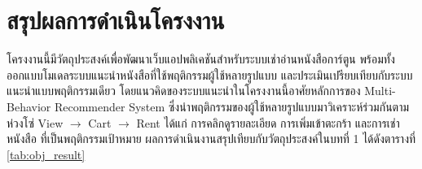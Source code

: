 
\section{สรุปผลการดำเนินโครงงาน}

โครงงานนี้มีวัตถุประสงค์เพื่อพัฒนาเว็บแอปพลิเคชันสำหรับระบบเช่าอ่านหนังสือการ์ตูน
พร้อมทั้งออกแบบโมเดลระบบแนะนำหนังสือที่ใช้พฤติกรรมผู้ใช้หลายรูปแบบ และประเมินเปรียบเทียบกับระบบแนะนำแบบพฤติกรรมเดียว
โดยแนวคิดของระบบแนะนำในโครงงานนี้อาศัยหลักการของ Multi-Behavior Recommender System
ซึ่งนำพฤติกรรมของผู้ใช้หลายรูปแบบมาวิเคราะห์ร่วมกันตามห่วงโซ่ View $\rightarrow$ Cart $\rightarrow$ Rent ได้แก่ การคลิกดูรายละเอียด การเพิ่มเข้าตะกร้า และการเช่าหนังสือ ที่เป็นพฤติกรรมเป้าหมาย
ผลการดำเนินงานสรุปเทียบกับวัตถุประสงค์ในบทที่ 1 ได้ดังตารางที่ \ref{tab:obj_result}


